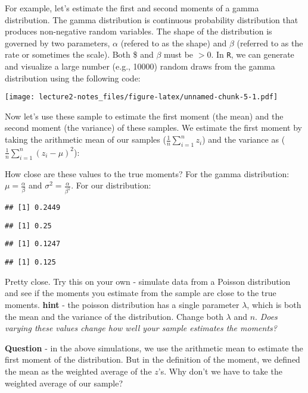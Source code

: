 \documentclass[]{article}
\begin{document}
For example, let's estimate the first and second moments of a gamma
distribution. The gamma distribution is continuous probability
distribution that produces non-negative random variables. The shape of
the distribution is governed by two parameters, \(\alpha\) (refered to
as the shape) and \(\beta\) (referred to as the rate or sometimes the
scale). Both \alpha\$ and \(\beta\) must be \(>0\). In \texttt{R}, we
can generate and visualize a large number (e.g., 10000) random draws
from the gamma distribution using the following code:

\texttt{[image: lecture2-notes\_files/figure-latex/unnamed-chunk-5-1.pdf]}

Now let's use these sample to estimate the first moment (the mean) and
the second moment (the variance) of these samples. We estimate the first
moment by taking the arithmetic mean of our samples
(\(\frac{1}{n}{\sum_{i=1}^{n}z_i}\)) and the variance as
(\(\frac{1}{n}{\sum_{i=1}^{n}(z_i-\mu)^2}\)):

How close are these values to the true moments? For the gamma
distribution: \(\mu = \frac{\alpha}{\beta}\) and
\(\sigma^2 = \frac{\alpha}{\beta^1}\). For our distribution:

\begin{verbatim}
## [1] 0.2449
\end{verbatim}

\begin{verbatim}
## [1] 0.25
\end{verbatim}

\begin{verbatim}
## [1] 0.1247
\end{verbatim}

\begin{verbatim}
## [1] 0.125
\end{verbatim}

Pretty close. Try this on your own - simulate data from a Poisson
distribution and see if the moments you estimate from the sample are
close to the true moments. \textbf{hint} - the poisson distribution has
a single parameter \(\lambda\), which is both the mean and the variance
of the distribution. Change both \(\lambda\) and \(n\). \emph{Does
varying these values change how well your sample estimates the moments?}

\textbf{Question} - in the above simulations, we use the arithmetic mean
to estimate the first moment of the distribution. But in the definition
of the moment, we defined the mean as the weighted average of the
\(z\)'s. Why don't we have to take the weighted average of our sample?
\end{document}
